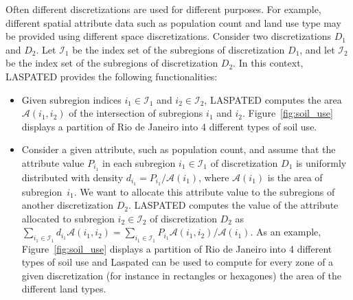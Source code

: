 \documentclass[article]{jss}
\newcommand{\ignore}[1]{}
\begin{document}
Often different discretizations are used for different purposes.
For example, different spatial attribute data such as population count and land use type may be provided using different space discretizations.
Consider two discretizations $D_{1}$ and $D_{2}$.
Let $\mathcal{I}_{1}$ be the index set of the subregions of discretization $D_{1}$, and let $\mathcal{I}_{2}$ be the index set of the subregions of discretization $D_{2}$.
In this context, LASPATED provides the following functionalities:
\begin{itemize}
\item
Given subregion indices $i_{1} \in \mathcal{I}_{1}$ and $i_{2} \in \mathcal{I}_{2}$, LASPATED computes the area $\mathcal{A}(i_{1},i_{2})$ of the intersection of subregions $i_{1}$ and $i_{2}$. Figure~\ref{fig:soil_use} displays a partition of Rio de Janeiro into 4 different types of soil use.
\item
Consider a given attribute, such as population count, and assume that the attribute value $P_{i_{1}}$ in each subregion $i_{1} \in \mathcal{I}_{1}$ of discretization $D_{1}$ is uniformly distributed with density $d_{i_{1}} = P_{i_{1}} / \mathcal{A}(i_{1})$, where $\mathcal{A}(i_{1})$ is the area of subregion~$i_{1}$.
We want to allocate this attribute value to the subregions of another discretization $D_{2}$.
LASPATED computes the value of the attribute allocated to subregion $i_{2} \in \mathcal{I}_{2}$ of discretization $D_{2}$ as $\displaystyle \sum_{i_{1} \in \mathcal{I}_{1}} d_{i_{1}} \mathcal{A}(i_{1},i_{2}) = \displaystyle \sum_{i_{1} \in \mathcal{I}_{1}} P_{i_{1}} \mathcal{A}(i_{1},i_{2}) / \mathcal{A}(i_{1})$. As an example, Figure~\ref{fig:soil_use} displays a partition of Rio de Janeiro into 4 different types of soil use and Laspated can be used to compute for every zone of a given discretization (for instance in rectangles or hexagones) the area of the different land types.
\ignore{
This calculation is simply obtained knowing attributes $P_{i_{1}}$ and areas $\mathcal{A}(i_{1})$ and $\mathcal{A}(i_{1},i_{2})$ (using get\_areas\_intersection).
The corresponding computation is done with LASPATED using method add\_geo\_variable.
In Example \ref{list:9}, we consider the attribute population.
We first read the corresponding shape file population.shp generating a GeoDataFrame object and filter only the columns "population" and "geometry".
This file can be found on the project GitHub page and gives the population in all the districts of the city of Rio de Janeiro.
Therefore, for this example Discretization $D_{1}$ is given by the districts of Rio de Janeiro (see Figure \ref{distfig}).
The GeoDataFrame object filtered as explained above is passed as an argument of method add\_geo\_variable.
The object app will contain information about the population of every elementary cell of discretization $D_{1}$ (see the next section).

}
\end{itemize}
\end{document}
